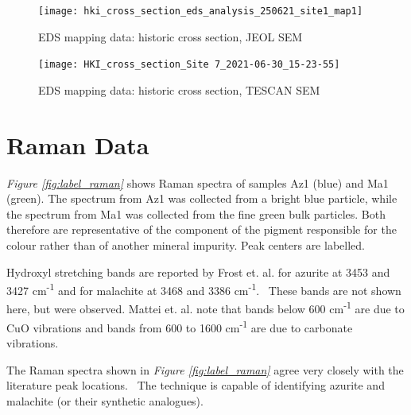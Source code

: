 \begin{figure}[H]
\centering
  \texttt{[image: hki\_cross\_section\_eds\_analysis\_250621\_site1\_map1]}
\caption[EDS mapping data: historic cross section, JEOL SEM]{EDS mapping data: historic cross section, JEOL SEM}
\label{fig:xsection_map1}
\end{figure}

\begin{figure}[H]
\centering
  \texttt{[image: HKI\_cross\_section\_Site 7\_2021-06-30\_15-23-55]}
\caption[EDS mapping data: historic cross section, TESCAN SEM]{EDS mapping data: historic cross section, TESCAN SEM}
\label{fig:xsection_map2}
\end{figure}



\section[Raman Data]{Raman Data}
\label{section3.3}

\textit{Figure \ref{fig:label_raman}} shows Raman spectra of samples Az1 (blue) and Ma1 (green). The spectrum from Az1 was collected from a bright blue particle, while the spectrum from Ma1 was collected from the fine green bulk particles. Both therefore are representative of the component of the pigment responsible for the colour rather than of another mineral impurity. Peak centers are labelled. 

Hydroxyl stretching bands are reported by Frost et. al. for azurite at 3453 and 3427 cm\textsuperscript{-1} and for malachite at 3468 and 3386 cm\textsuperscript{-1}.~\autocite{Frost} These bands are not shown here, but were observed. Mattei et. al. note that bands below 600 cm\textsuperscript{-1} are due to CuO vibrations and bands from 600 to 1600 cm\textsuperscript{-1} are due to carbonate vibrations.~\autocite{Mattei}

The Raman spectra shown in \textit{Figure \ref{fig:label_raman}} agree very closely with the literature peak locations.~\autocite{Mattei,Frost,Bicchieri} The technique is capable of identifying azurite and malachite (or their synthetic analogues).

